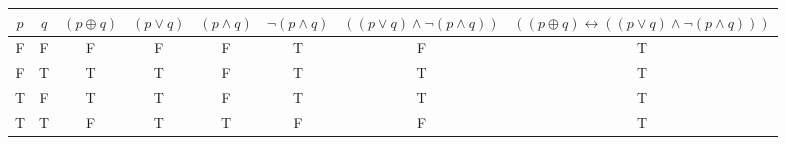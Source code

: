 \begin{tabular}{|c|c||c|c|c|c|c|c|}
\hline
$ p $ & $ q $ & $ (p \oplus q) $ & $ (p \vee q) $ & $ (p \wedge q) $ & $  \neg (p \wedge q) $ & $ ((p \vee q) \wedge  \neg (p \wedge q)) $ & $ ((p \oplus q) \leftrightarrow ((p \vee q) \wedge  \neg (p \wedge q))) $ \\
\hline
F & F & F & F & F & T & F & T \\
F & T & T & T & F & T & T & T \\
T & F & T & T & F & T & T & T \\
T & T & F & T & T & F & F & T \\
\hline
\end{tabular}
